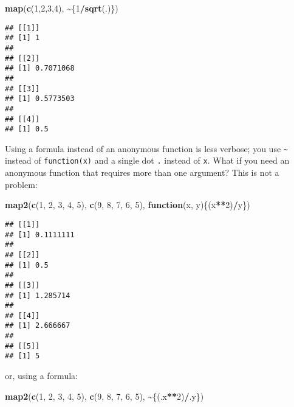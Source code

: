 \documentclass[
]{article}
\newenvironment{Shaded}{\begin{snugshade}}{\end{snugshade}}
\newcommand{\ControlFlowTok}[1]{\textcolor[rgb]{0.13,0.29,0.53}{\textbf{#1}}}
\newcommand{\DecValTok}[1]{\textcolor[rgb]{0.00,0.00,0.81}{#1}}
\newcommand{\KeywordTok}[1]{\textcolor[rgb]{0.13,0.29,0.53}{\textbf{#1}}}
\newcommand{\NormalTok}[1]{#1}
\newcommand{\OperatorTok}[1]{\textcolor[rgb]{0.81,0.36,0.00}{\textbf{#1}}}
\begin{document}
\begin{Shaded}
\begin{Highlighting}[]
\KeywordTok{map}\NormalTok{(}\KeywordTok{c}\NormalTok{(}\DecValTok{1}\NormalTok{,}\DecValTok{2}\NormalTok{,}\DecValTok{3}\NormalTok{,}\DecValTok{4}\NormalTok{), }\OperatorTok{\textasciitilde{}}\NormalTok{\{}\DecValTok{1}\OperatorTok{/}\KeywordTok{sqrt}\NormalTok{(.)\})}
\end{Highlighting}
\end{Shaded}

\begin{verbatim}
## [[1]]
## [1] 1
## 
## [[2]]
## [1] 0.7071068
## 
## [[3]]
## [1] 0.5773503
## 
## [[4]]
## [1] 0.5
\end{verbatim}

Using a formula instead of an anonymous function is less verbose; you use \texttt{\textasciitilde{}} instead of \texttt{function(x)}
and a single dot \texttt{.} instead of \texttt{x}. What if you need an anonymous function that requires more than
one argument? This is not a problem:

\begin{Shaded}
\begin{Highlighting}[]
\KeywordTok{map2}\NormalTok{(}\KeywordTok{c}\NormalTok{(}\DecValTok{1}\NormalTok{, }\DecValTok{2}\NormalTok{, }\DecValTok{3}\NormalTok{, }\DecValTok{4}\NormalTok{, }\DecValTok{5}\NormalTok{), }\KeywordTok{c}\NormalTok{(}\DecValTok{9}\NormalTok{, }\DecValTok{8}\NormalTok{, }\DecValTok{7}\NormalTok{, }\DecValTok{6}\NormalTok{, }\DecValTok{5}\NormalTok{), }\ControlFlowTok{function}\NormalTok{(x, y)\{(x}\OperatorTok{**}\DecValTok{2}\NormalTok{)}\OperatorTok{/}\NormalTok{y\})}
\end{Highlighting}
\end{Shaded}

\begin{verbatim}
## [[1]]
## [1] 0.1111111
## 
## [[2]]
## [1] 0.5
## 
## [[3]]
## [1] 1.285714
## 
## [[4]]
## [1] 2.666667
## 
## [[5]]
## [1] 5
\end{verbatim}

or, using a formula:

\begin{Shaded}
\begin{Highlighting}[]
\KeywordTok{map2}\NormalTok{(}\KeywordTok{c}\NormalTok{(}\DecValTok{1}\NormalTok{, }\DecValTok{2}\NormalTok{, }\DecValTok{3}\NormalTok{, }\DecValTok{4}\NormalTok{, }\DecValTok{5}\NormalTok{), }\KeywordTok{c}\NormalTok{(}\DecValTok{9}\NormalTok{, }\DecValTok{8}\NormalTok{, }\DecValTok{7}\NormalTok{, }\DecValTok{6}\NormalTok{, }\DecValTok{5}\NormalTok{), }\OperatorTok{\textasciitilde{}}\NormalTok{\{(.x}\OperatorTok{**}\DecValTok{2}\NormalTok{)}\OperatorTok{/}\NormalTok{.y\})}
\end{Highlighting}
\end{Shaded}
\end{document}
